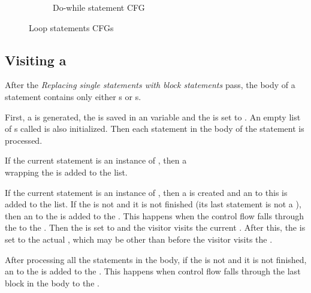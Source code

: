 \begin{figure}[htb]
{\begin{subfigure}[b]{0.4\textwidth}
        \caption{Do-while statement CFG\label{img:do-while-statement}}
    \end{subfigure}
    }
    \caption{Loop statements CFGs\label{img:loop-statement}}
\end{figure}

\subsection{Visiting a }

After the \textit{Replacing single statements with block statements} pass, the body of a  statement
contains only either s or s.

First, a  is generated, the  is saved in an  variable and
the  is set to . An empty list of s called 
is also initialized. Then each statement in the body of the  statement is processed.

If the current statement is an instance of , then a\\
 wrapping the  is added to the  list.

If the current statement is an instance of , then a  is created and an
 to this  is added to the  list. If the
 is not  and it is not finished (its last statement is not a
), then an  to the  is added to the
. This happens when the control flow falls through the  to
the . Then the  is set to  and the visitor visits the current
. After this, the  is set to the actual ,
which may be other than before the visitor visits the .

After processing all the statements in the  body, if the  is not 
and it is not finished, an  to the  is added to the
. This happens when control flow falls through the last block in the  body to
the .

